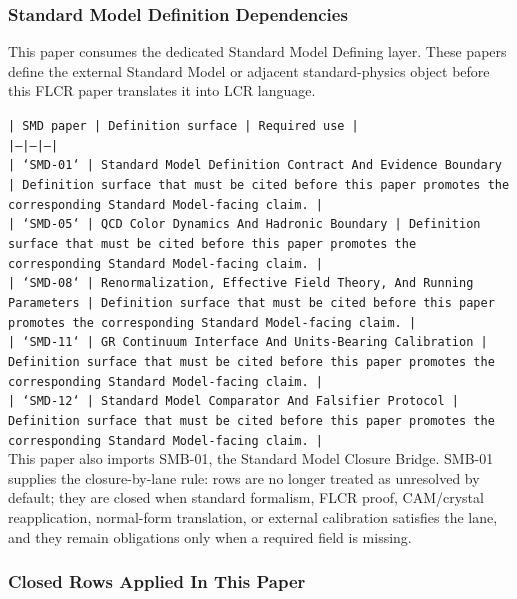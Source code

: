 \documentclass[11pt]{article}
\begin{document}
\subsubsection*{Standard Model Definition Dependencies}

This paper consumes the dedicated Standard Model Defining layer. These papers define the external Standard Model or adjacent standard-physics object before this FLCR paper translates it into LCR language.

\noindent\texttt{| SMD paper | Definition surface | Required use |}\\
\noindent\texttt{|---|---|---|}\\
\noindent\texttt{| `SMD-01` | Standard Model Definition Contract And Evidence Boundary | Definition surface that must be cited before this paper promotes the corresponding Standard Model-facing claim. |}\\
\noindent\texttt{| `SMD-05` | QCD Color Dynamics And Hadronic Boundary | Definition surface that must be cited before this paper promotes the corresponding Standard Model-facing claim. |}\\
\noindent\texttt{| `SMD-08` | Renormalization, Effective Field Theory, And Running Parameters | Definition surface that must be cited before this paper promotes the corresponding Standard Model-facing claim. |}\\
\noindent\texttt{| `SMD-11` | GR Continuum Interface And Units-Bearing Calibration | Definition surface that must be cited before this paper promotes the corresponding Standard Model-facing claim. |}\\
\noindent\texttt{| `SMD-12` | Standard Model Comparator And Falsifier Protocol | Definition surface that must be cited before this paper promotes the corresponding Standard Model-facing claim. |}\\

This paper also imports SMB-01, the Standard Model Closure Bridge. SMB-01 supplies the closure-by-lane rule: rows are no longer treated as unresolved by default; they are closed when standard formalism, FLCR proof, CAM/crystal reapplication, normal-form translation, or external calibration satisfies the lane, and they remain obligations only when a required field is missing.

\subsubsection*{Closed Rows Applied In This Paper}
\end{document}
